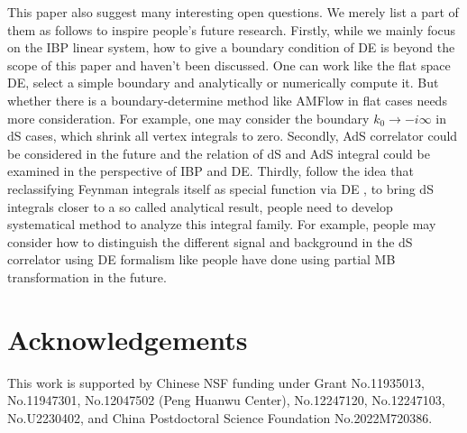 \documentclass[a4paper,11pt]{article}
\begin{document}
This paper also suggest many interesting open questions. We merely list a part of them as follows to inspire people's future research. Firstly, while we mainly focus on the IBP linear system, how to give a boundary condition of DE is beyond the scope of this paper and haven't been discussed. One can work like the flat space DE, select a simple boundary and analytically or numerically compute it. But whether there is a  boundary-determine method like AMFlow 
 \cite{Liu:2017jxz,Liu:2022mfb} in flat cases needs more consideration. For example, one may consider the boundary $k_0\to -i \infty$ in dS cases, which shrink all vertex integrals to zero. Secondly, AdS correlator could be considered in the future and the relation of dS and AdS integral could be examined in the perspective of IBP and DE. Thirdly, follow the idea that reclassifying Feynman integrals itself as special function via DE \cite{Liu:2023jkr},
to bring dS integrals closer to a so called analytical result, people need to develop systematical method to analyze this integral family. For example, people may consider how to distinguish the different signal and background in the dS correlator using DE formalism like people have done  using partial MB transformation \cite{Qin:2022fbv} in the future.



\section*{Acknowledgements}
This work is supported by Chinese NSF funding under Grant No.11935013, No.11947301, No.12047502 (Peng Huanwu Center), No.12247120, No.12247103, No.U2230402, and China Postdoctoral Science Foundation No.2022M720386.




\end{document}
